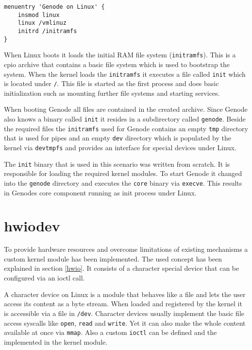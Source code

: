 \documentclass[
a4paper,
12pt,
notitlepage,
parskip=half,
DIV=11,
]{scrbook}
\begin{document}
		\begin{lstlisting}[basicstyle=\ttfamily\footnotesize]
menuentry 'Genode on Linux' {
	insmod linux
	linux /vmlinuz
	initrd /initramfs
}
		\end{lstlisting}
		
		When Linux boots it loads the initial RAM file system (\texttt{initramfs}).
		This is a cpio archive that contains a basic file system which is used to bootstrap the system.
		When the kernel loads the \texttt{initramfs} it executes a file called \texttt{init} which is located under \texttt{/}.
		This file is started as the first process and does basic initialization such as mounting further file systems and starting services.
		
		When booting Genode all files are contained in the created archive.
		Since Genode also knows a binary called \texttt{init} it resides in a subdirectory called \texttt{genode}.
		Beside the required files the \texttt{initramfs} used for Genode contains an empty \texttt{tmp} directory that is used for pipes and an empty \texttt{dev} directory which is populated by the kernel via \texttt{devtmpfs} and provides an interface for special devices under Linux.
		
		The \texttt{init} binary that is used in this scenario was written from scratch.
		It is responsible for loading the required kernel modules.
		To start Genode it changed into the \texttt{genode} directory and executes the \texttt{core} binary via \texttt{execve}.
		This results in Genodes core component running as init process under Linux.
		
		\section{hwiodev}
		\label{hwiodev}
		
		To provide hardware resources and overcome limitations of existing mechanisms a custom kernel module has been implemented.
		The used concept has been explained in section \ref{hwio}.
		It consists of a character special device that can be configured via an ioctl call.
		
		A character device on Linux is a module that behaves like a file and lets the user access its content as a byte stream.
		When loaded and registered by the kernel it is accessible via a file in \texttt{/dev}.
		Character devices usually implement the basic file access syscalls like \texttt{open}, \texttt{read} and \texttt{write}.
		Yet it can also make the whole content available at once via \texttt{mmap}.
		Also a custom \texttt{ioctl} can be defined and the implemented in the kernel module. \citep{books/daglib/0012446}
		
\end{document}
